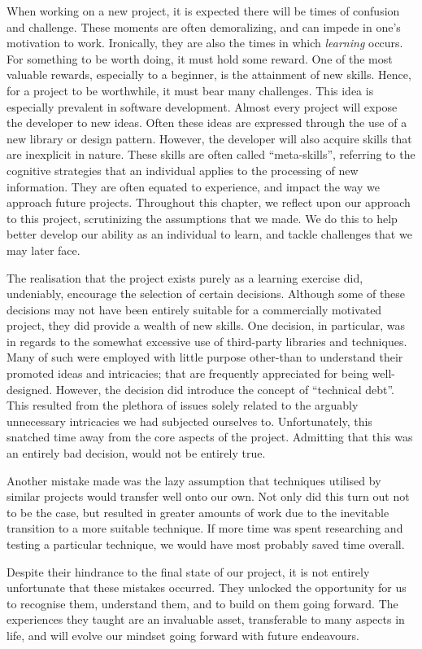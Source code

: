 \documentclass{standalone}
\begin{document}
	When working on a new project, it is expected there will be times of confusion and challenge. These moments are often demoralizing, and can impede in one's motivation to work. Ironically, they are also the times in which \emph{learning} occurs. For something to be worth doing, it must hold some reward. One of the most valuable rewards, especially to a beginner, is the attainment of new skills. Hence, for a project to be worthwhile, it must bear many challenges. This idea is especially prevalent in software development. Almost every project will expose the developer to new ideas. Often these ideas are expressed through the use of a new library or design pattern. However, the developer will also acquire skills that are inexplicit in nature. These skills are often called \enquote{meta-skills}, referring to the cognitive strategies that an individual applies to the processing of new information. They are often equated to experience, and impact the way we approach future projects. Throughout this chapter, we reflect upon our approach to this project, scrutinizing the assumptions that we made. We do this to help better develop our ability as an individual to learn, and tackle challenges that we may later face.

	The realisation that the project exists purely as a learning exercise did, undeniably, encourage the selection of certain decisions. Although some of these decisions may not have been entirely suitable for a commercially motivated project, they did provide a wealth of new skills. One decision, in particular, was in regards to the somewhat excessive use of third-party libraries and techniques. Many of such were employed with little purpose other-than to understand their promoted ideas and intricacies; that are frequently appreciated for being well-designed. However, the decision did introduce the concept of \enquote{technical debt}. This resulted from the plethora of issues solely related to the arguably unnecessary intricacies we had subjected ourselves to. Unfortunately, this snatched time away from the core aspects of the project. Admitting that this was an entirely bad decision, would not be entirely true.

	Another mistake made was the lazy assumption that techniques utilised by similar projects would transfer well onto our own. Not only did this turn out not to be the case, but resulted in greater amounts of work due to the inevitable transition to a more suitable technique. If more time was spent researching and testing a particular technique, we would have most probably saved time overall.

	Despite their hindrance to the final state of our project, it is not entirely unfortunate that these mistakes occurred. They unlocked the opportunity for us to recognise them, understand them, and to build on them going forward. The experiences they taught are an invaluable asset, transferable to many aspects in life, and will evolve our mindset going forward with future endeavours.
\end{document}
